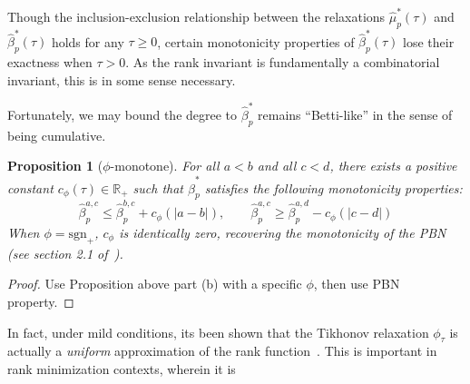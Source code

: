 \documentclass[10pt]{article}
\numberwithin{equation}{section}
\newcommand{\+}{%
	\raisebox{0.18ex}{\scaleobj{0.55}{+}}
}
\newtheorem{proposition}{Proposition}
\newtheorem{corollary}{Corollary}
\theoremstyle{definition}
\theoremstyle{definition}
\begin{document}
\noindent Though the inclusion-exclusion relationship between the relaxations $\hat{\mu}_{p}^\ast(\tau)$ and $\hat{\beta}_{p}^{\ast}(\tau)$ holds for any $\tau \geq 0$, certain monotonicity properties of $\hat{\beta}_{p}^{\ast}(\tau)$ lose their exactness when $\tau > 0$.
As the rank invariant is fundamentally a combinatorial invariant, this is in some sense necessary.
  
Fortunately, we may bound the degree to $\hat{\beta}_p^\ast$ remains ``Betti-like'' in the sense of being cumulative. 
\begin{proposition}[$\phi$-monotone]
For all $a < b$ and all $c < d$, there exists a positive constant $c_\phi(\tau) \in \mathbb{R}_+$ such that $\hat{\beta}_p^\ast$ satisfies the following monotonicity properties:
\begin{equation}
	\hat{\beta}_p^{a,c} \leq \hat{\beta}_p^{b,c} + c_\phi(\lvert a - b \rvert), \quad \quad \hat{\beta}_p^{a,c} \geq \hat{\beta}_p^{a,d} - c_\phi(\lvert c - d \rvert)
\end{equation}
When $\phi = \mathrm{sgn}_+$, $c_\phi$ is identically zero, recovering the monotonicity of the PBN (see section 2.1 of~\cite{cerri2013betti}). 
\end{proposition}
\begin{proof}
	Use Proposition above part (b) with a specific $\phi$, then use PBN property.
\end{proof}
In fact, under mild conditions, its been shown that the Tikhonov relaxation $\phi_\tau$ is actually a \emph{uniform} approximation of the rank function~\cite{}. This is important in rank minimization contexts, wherein it is 


\end{document}
